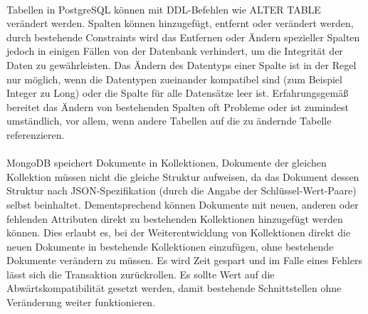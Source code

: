 \paragraph{}
Tabellen in PostgreSQL können mit DDL-Befehlen wie ALTER TABLE verändert werden. Spalten können hinzugefügt, entfernt oder verändert werden, durch bestehende Constraints wird das Entfernen oder Ändern spezieller Spalten jedoch in einigen Fällen von der Datenbank verhindert, um die Integrität der Daten zu gewährleisten. Das Ändern des Datentyps einer Spalte ist in der Regel nur möglich, wenn die Datentypen zueinander kompatibel sind (zum Beispiel Integer zu Long) oder die Spalte für alle Datensätze leer ist. Erfahrungsgemäß bereitet das Ändern von bestehenden Spalten oft Probleme oder ist zumindest umständlich, vor allem, wenn andere Tabellen auf die zu ändernde Tabelle referenzieren.

\paragraph{}
MongoDB speichert Dokumente in Kollektionen, Dokumente der gleichen Kollektion müssen nicht die gleiche Struktur aufweisen, da das Dokument dessen Struktur nach JSON-Spezifikation (durch die Angabe der Schlüssel-Wert-Paare) selbst beinhaltet. Dem\-entsprechend können Dokumente mit neuen, anderen oder fehlenden Attributen direkt zu bestehenden Kollektionen hinzugefügt werden können. Dies erlaubt es, bei der Weiterentwicklung von Kollektionen direkt die neuen Dokumente in bestehende Kollektionen einzufügen, ohne bestehende Dokumente verändern zu müssen. Es wird Zeit gespart und im Falle eines Fehlers lässt sich die Transaktion zurückrollen. Es sollte Wert auf die Abwärtskompatibilität gesetzt werden, damit bestehende Schnittstellen ohne Veränderung weiter funktionieren.


